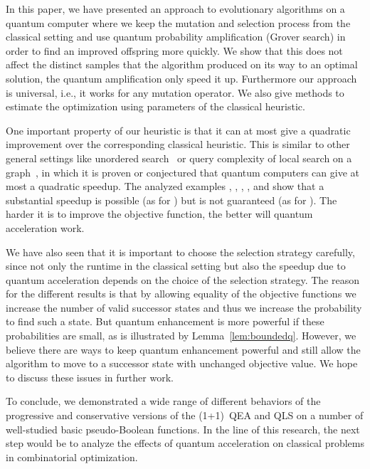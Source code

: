 In this paper, we have presented an approach to evolutionary
algorithms on a quantum computer where we keep the mutation and
selection process from the classical setting and use quantum
probability amplification (Grover search) in order to find an improved
offspring more quickly. We show that this does not affect the distinct
samples that the algorithm produced on its way to an optimal solution,
the quantum amplification only speed it up.  Furthermore our approach
is universal, i.e., it works for any mutation operator. We also give
methods to estimate the optimization using parameters of the classical
heuristic.

One important property of our heuristic is that it can at most give a
quadratic improvement over the corresponding classical heuristic. This
is similar to other general settings like unordered
search~\cite{BennetBBGV1997,Zalka99} or query complexity of local
search on a graph~\cite{Aaronson06}, in which it is proven or
conjectured that quantum computers can give at most a quadratic
speedup. The analyzed examples \onemax, \leadingones, \discrepancy,
\needle, and \jumpm show that a substantial speedup is possible (as
for \leadingones) but is not guaranteed (as for \discrepancy). The
harder it is to improve the objective function, the better will
quantum acceleration work. 


We have also seen that it is important to choose the selection
strategy carefully, since not only the runtime in the classical
setting but also the speedup due to quantum acceleration depends on
the choice of the selection strategy.  The reason for the different
results is that by allowing equality of the objective functions we
increase the number of valid successor states and thus we increase the
probability to find such a state. But quantum enhancement is more
powerful if these probabilities are small, as is illustrated by
Lemma~\ref{lem:boundedq}. However, we believe there are ways to keep
quantum enhancement powerful and still allow the algorithm to move to
a successor state with unchanged objective value. We hope to discuss
these issues in further work.


To conclude, we demonstrated a wide range of different behaviors of
the progressive and conservative versions of the (1+1)~QEA and QLS on
a number of well-studied basic pseudo-Boolean functions. In the line
of this research, the next step would be to analyze the effects of
quantum acceleration on classical problems in combinatorial
optimization.

